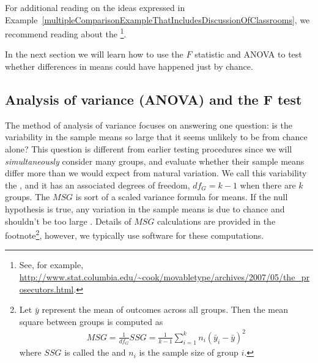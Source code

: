 For additional reading on the ideas expressed in Example~\ref{multipleComparisonExampleThatIncludesDiscussionOfClassrooms}, we recommend reading about the \footnote{See, for example, \url{http://www.stat.columbia.edu/~cook/movabletype/archives/2007/05/the_prosecutors.html}.}.

In the next section we will learn how to use the $F$ statistic and ANOVA to test whether differences in means could have happened just by chance.


\subsection{Analysis of variance (ANOVA) and the F test}

The method of analysis of variance focuses on answering one question: is the variability in the sample means so large that it seems unlikely to be from chance alone? This question is different from earlier testing procedures since we will \emph{simultaneously} consider many groups, and evaluate whether their sample means differ more than we would expect from natural variation. We call this variability the , and it has an associated degrees of freedom, $df_{G}=k-1$ when there are $k$ groups. The $MSG$ is sort of a scaled variance formula for means. If the null hypothesis is true, any variation in the sample means is due to chance and shouldn't be too large%
. Details of $MSG$ calculations are provided in the footnote\footnote{Let $\bar{y}$ represent the mean of outcomes across all groups. Then the mean square between groups is computed as
\begin{align*}
MSG = \frac{1}{df_{G}}SSG = \frac{1}{k-1}\sum_{i=1}^{k} n_{i}\left(\bar{y}_{i} - \bar{y}\right)^2
\end{align*}
where $SSG$ is called the  and $n_{i}$ is the sample size of group $i$.}, however, we typically use software for these computations.

